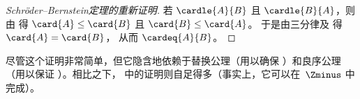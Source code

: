 \documentclass[../../../include/open-logic-section]{subfiles}
\begin{document}
\begin{proof}[Schröder--Bernstein定理的重新证明]
若 $\cardle{A}{B}$ 且 $\cardle{B}{A}$，则由  得
$\card{A} \leq \card{B}$ 且 $\card{B} \leq \card{A}$。
于是由三分律及  得 $\card{A} = \card{B}$，
从而 $\cardeq{A}{B}$。
\end{proof}

\noindent
尽管这个证明非常简单，但它隐含地依赖于替换公理（用以确保
）和良序公理（用以保证
）。相比之下，
中的证明则自足得多（事实上，它可以在~$\Zminus$ 中完成）。
\end{document}

